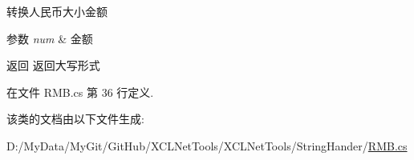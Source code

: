 转换人民币大小金额 


\begin{DoxyParams}{参数}
{\em num} & 金额\\
\hline
\end{DoxyParams}
\begin{DoxyReturn}{返回}
返回大写形式
\end{DoxyReturn}


在文件 R\-M\-B.\-cs 第 36 行定义.



该类的文档由以下文件生成\-:\begin{DoxyCompactItemize}
\item 
D\-:/\-My\-Data/\-My\-Git/\-Git\-Hub/\-X\-C\-L\-Net\-Tools/\-X\-C\-L\-Net\-Tools/\-String\-Hander/\hyperlink{_r_m_b_8cs}{R\-M\-B.\-cs}\end{DoxyCompactItemize}
